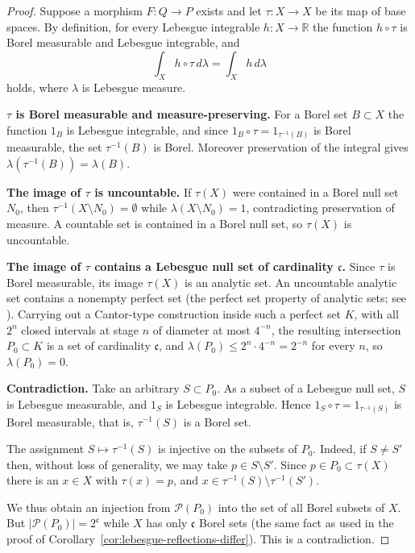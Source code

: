 \begin{proof}
  Suppose a morphism $F:Q\to P$ exists and let $\tau:X\to X$ be its map of base
  spaces.
  By definition, for every Lebesgue integrable $h:X\to\mathbb{R}$ the function
  $h\circ\tau$ is Borel measurable and Lebesgue integrable, and
  \[
    \int_X h\circ\tau\,d\lambda=\int_X h\,d\lambda
  \]
  holds, where $\lambda$ is Lebesgue measure.

  \textbf{$\tau$ is Borel measurable and measure-preserving.}
  For a Borel set $B\subset X$ the function $1_B$ is Lebesgue integrable, and
  since $1_B\circ\tau=1_{\tau^{-1}(B)}$ is Borel measurable, the set
  $\tau^{-1}(B)$ is Borel.
  Moreover preservation of the integral gives
  $\lambda(\tau^{-1}(B))=\lambda(B)$.

  \textbf{The image of $\tau$ is uncountable.}
  If $\tau(X)$ were contained in a Borel null set $N_0$, then
  $\tau^{-1}(X\setminus N_0)=\emptyset$ while
  $\lambda(X\setminus N_0)=1$, contradicting preservation of measure.
  A countable set is contained in a Borel null set, so $\tau(X)$ is
  uncountable.

  \textbf{The image of $\tau$ contains a Lebesgue null set of cardinality
  $\mathfrak{c}$.}
  Since $\tau$ is Borel measurable, its image $\tau(X)$ is an analytic set.
  An uncountable analytic set contains a nonempty perfect set (the perfect set
  property of analytic sets; see \cite{Kechris}).
  Carrying out a Cantor-type construction inside such a perfect set $K$, with
  all $2^n$ closed intervals at stage $n$ of diameter at most $4^{-n}$, the
  resulting intersection $P_0\subset K$ is a set of cardinality $\mathfrak{c}$,
  and $\lambda(P_0)\le2^n\cdot4^{-n}=2^{-n}$ for every $n$, so
  $\lambda(P_0)=0$.

  \textbf{Contradiction.}
  Take an arbitrary $S\subset P_0$. As a subset of a Lebesgue null set, $S$ is
  Lebesgue measurable, and $1_S$ is Lebesgue integrable.
  Hence $1_S\circ\tau=1_{\tau^{-1}(S)}$ is Borel measurable, that is,
  $\tau^{-1}(S)$ is a Borel set.

  The assignment $S\mapsto\tau^{-1}(S)$ is injective on the subsets of $P_0$.
  Indeed, if $S\ne S'$ then, without loss of generality, we may take
  $p\in S\setminus S'$.
  Since $p\in P_0\subset\tau(X)$ there is an $x\in X$ with $\tau(x)=p$, and
  $x\in\tau^{-1}(S)\setminus\tau^{-1}(S')$.

  We thus obtain an injection from $\mathcal{P}(P_0)$ into the set of all Borel
  subsets of $X$.
  But $|\mathcal{P}(P_0)|=2^{\mathfrak{c}}$ while $X$ has only $\mathfrak{c}$
  Borel sets (the same fact as used in the proof of
  Corollary~\ref{cor:lebesgue-reflections-differ}).
  This is a contradiction.
\end{proof}

